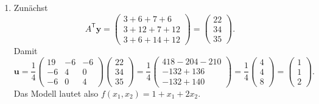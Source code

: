 {\begin{enumerate}[label=\alph*)]
  \item Zunächst
  \[
  A^{\mathsf{T}} \mathbf{y} =
  \begin{pmatrix}
  3+6+7+6 \\
  3+12+7+12 \\
  3+6+14+12
  \end{pmatrix}
  = \begin{pmatrix} 22 \\ 34 \\ 35 \end{pmatrix}.
  \]
  Damit
  \[
  \mathbf{u}
  = \frac{1}{4}
  \begin{pmatrix}
  19 & -6 & -6 \\
  -6 & 4 & 0 \\
  -6 & 0 & 4
  \end{pmatrix}
  \begin{pmatrix} 22 \\ 34 \\ 35 \end{pmatrix}
  = \frac{1}{4}\begin{pmatrix} 418-204-210 \\ -132+136 \\ -132+140 \end{pmatrix}
  = \frac{1}{4}\begin{pmatrix} 4 \\ 4 \\ 8 \end{pmatrix}
  = \begin{pmatrix} 1 \\ 1 \\ 2 \end{pmatrix}.
  \]
  Das Modell lautet also $f(x_1,x_2) = 1 + x_1 + 2x_2$.
\end{enumerate}
}





